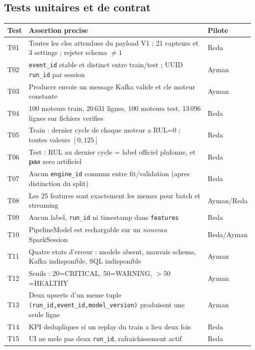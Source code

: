 \documentclass[10pt,a4paper]{article}
\newcommand{\code}[1]{{\small\ttfamily\nolinkurl{#1}}}
\begin{document}
\subsection{Tests unitaires et de contrat}
\begin{longtable}{@{}p{16mm}p{85mm}p{48mm}@{}}
\toprule
\textbf{Test} & \textbf{Assertion precise} & \textbf{Pilote}\\\midrule
\endhead
T01 & Toutes les cles attendues du payload V1 ; 21 capteurs et 3 settings ; rejeter schema \(\ne1\) & Reda\\
T02 & \code{event_id} stable et distinct entre train/test ; UUID \code{run_id} par session & Ayman\\
T03 & Producer envoie un message Kafka valide et cle moteur constante & Ayman\\
T04 & 100 moteurs train, 20\,631 lignes, 100 moteurs test, 13\,096 lignes sur fichiers verifies & Reda\\
T05 & Train : dernier cycle de chaque moteur a RUL=0 ; toutes valeurs \([0,125]\) & Reda\\
T06 & Test : RUL au dernier cycle = label officiel plafonne, et \textbf{pas} zero artificiel & Reda\\
T07 & Aucun \code{engine_id} commun entre fit/validation (apres distinction du split) & Reda\\
T08 & Les 25 features sont exactement les memes pour batch et streaming & Ayman/Reda\\
T09 & Aucun label, \code{run_id} ni timestamp dans \code{features} & Reda\\
T10 & PipelineModel est rechargable sur un \emph{nouveau} SparkSession & Reda/Ayman\\
T11 & Quatre etats d'erreur : modele absent, mauvais schema, Kafka indisponible, SQL indisponible & Ayman\\
T12 & Seuils : 20=CRITICAL, 50=WARNING, \(>50\)=HEALTHY & Ayman\\
T13 & Deux upserts d'un meme tuple \code{(run_id,event_id,model_version)} produisent une seule ligne & Ayman\\
T14 & KPI dedupliques si un replay du train a lieu deux fois & Reda\\
T15 & UI ne mele pas deux \code{run_id}, rafraichissement actif & Reda\\
\bottomrule
\end{longtable}
\end{document}
